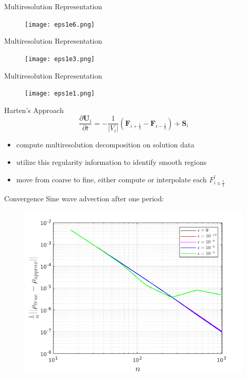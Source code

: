 \documentclass{beamer}
\begin{document}
\begin{frame}{Multiresolution Representation}
    \begin{figure}
        \center
        \texttt{[image: eps1e6.png]}
    \end{figure}
\end{frame}

\begin{frame}{Multiresolution Representation}
    \begin{figure}
        \center
        \texttt{[image: eps1e3.png]}
    \end{figure}
\end{frame}

\begin{frame}{Multiresolution Representation}
    \begin{figure}
        \center
        \texttt{[image: eps1e1.png]}
    \end{figure}
\end{frame}

\begin{frame}{Harten's Approach}
    \begin{equation*}
        \frac{\partial \mathbf{U}_{i}}{\partial t} = -\frac{1}{|V_{i}|} \left( \mathbf{F}_{i+\frac{1}{2}}
            - \mathbf{F}_{i-\frac{1}{2}} \right) + \mathbf{S}_{i}
    \end{equation*}
    \begin{itemize}
        \item<2-> compute multiresolution decomposition on solution data
        \item<2-> utilize this regularity information to identify smooth regions
        \item<3-> move from coarse to fine, either compute or interpolate each
            $F^{l}_{i\pm \frac{1}{2}}$
    \end{itemize}
\end{frame}

\begin{frame}{Convergence}
  Sine wave advection after one period:
  \begin{figure}
    \center
    \includegraphics[scale=0.5]{convergence.png}
  \end{figure}
\end{frame}
\end{document}
